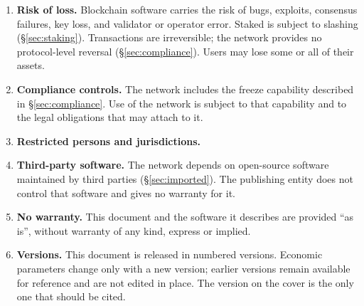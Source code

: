 \begin{enumerate}[leftmargin=*]
{  variable, depend on bonded stake and block time, may be zero or negative in
  real terms, are reduced by validator commission and by slashing, and are not
  a return, yield or income offered or promised by the publishing entity or by
  anyone else. Nothing in this document is intended to create an expectation
  of profit.}
\item \textbf{Risk of loss.} Blockchain software carries the risk of bugs,
  exploits, consensus failures, key loss, and validator or operator error.
  Staked \kash{} is subject to slashing (\S\ref{sec:staking}). Transactions are
  irreversible; the network provides no protocol-level reversal
  (\S\ref{sec:compliance}). Users may lose some or all of their
  assets.
\item \textbf{Compliance controls.} The network includes the freeze capability
  described in \S\ref{sec:compliance}. Use of the network is subject to that
  capability and to the legal obligations that may attach to it.
\item \textbf{Restricted persons and jurisdictions.} 
\item \textbf{Third-party software.} The network depends on open-source
  software maintained by third parties (\S\ref{sec:imported}). The publishing
  entity does not control that software and gives no warranty for it.
\item \textbf{No warranty.} This document and the software it describes are
  provided ``as is'', without warranty of any kind, express or implied.
\item \textbf{Versions.} This document is released in numbered versions.
  Economic parameters change only with a new version; earlier versions remain
  available for reference and are not edited in place. The version on the
  cover is the only one that should be cited.
\end{enumerate}
